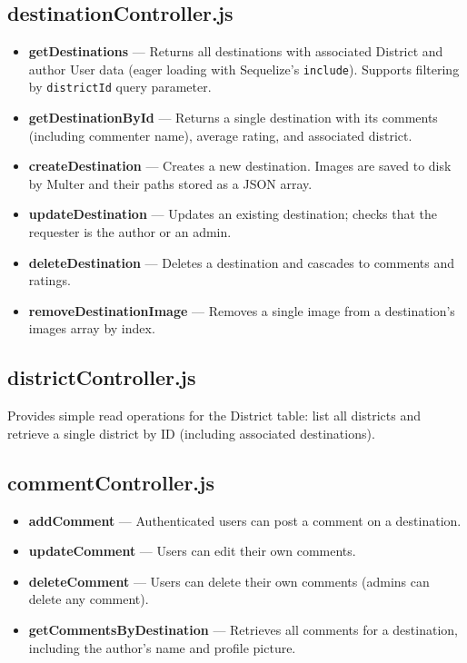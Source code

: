 \documentclass[12pt,a4paper]{report}
\begin{document}
\subsection{destinationController.js}

\begin{itemize}[leftmargin=2em]
  \item \textbf{getDestinations} — Returns all destinations with associated District and author User data (eager loading with Sequelize's \texttt{include}). Supports filtering by \texttt{districtId} query parameter.
  \item \textbf{getDestinationById} — Returns a single destination with its comments (including commenter name), average rating, and associated district.
  \item \textbf{createDestination} — Creates a new destination. Images are saved to disk by Multer and their paths stored as a JSON array.
  \item \textbf{updateDestination} — Updates an existing destination; checks that the requester is the author or an admin.
  \item \textbf{deleteDestination} — Deletes a destination and cascades to comments and ratings.
  \item \textbf{removeDestinationImage} — Removes a single image from a destination's images array by index.
\end{itemize}

\subsection{districtController.js}

Provides simple read operations for the District table: list all districts and retrieve a single district by ID (including associated destinations).

\subsection{commentController.js}

\begin{itemize}[leftmargin=2em]
  \item \textbf{addComment} — Authenticated users can post a comment on a destination.
  \item \textbf{updateComment} — Users can edit their own comments.
  \item \textbf{deleteComment} — Users can delete their own comments (admins can delete any comment).
  \item \textbf{getCommentsByDestination} — Retrieves all comments for a destination, including the author's name and profile picture.
\end{itemize}
\end{document}
